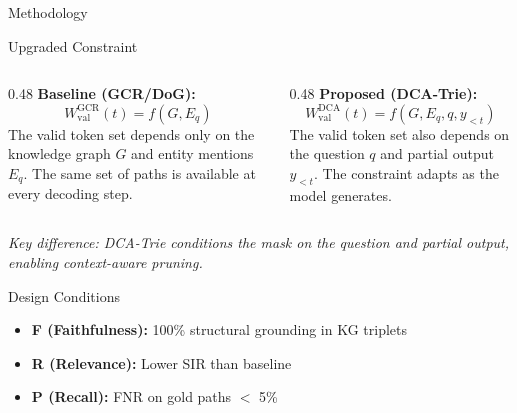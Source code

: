 \documentclass{beamer}
\begin{document}
\begin{frame}{Methodology}
\begin{figure}[h]
{
  }%
\end{figure}
\end{frame}

\begin{frame}{Upgraded Constraint}
  \begin{columns}[T]
    \begin{column}{0.48\textwidth}
      \textbf{Baseline (GCR/DoG):}
      \[
        W_{\text{val}}^{\text{GCR}}(t) = f(G, E_q)
      \]
      \vspace{0.3em}
      \footnotesize The valid token set depends only on the knowledge graph $G$ and entity mentions $E_q$. The same set of paths is available at every decoding step.
    \end{column}
    \begin{column}{0.48\textwidth}
      \textbf{Proposed (DCA-Trie):}
      \[
        W_{\text{val}}^{\text{DCA}}(t) = f(G, E_q, q, y_{<t})
      \]
      \vspace{0.3em}
      \footnotesize The valid token set also depends on the question $q$ and partial output $y_{<t}$. The constraint adapts as the model generates.
    \end{column}
  \end{columns}

  \vspace{0.5em}
  \centering
  \small\textit{Key difference: DCA-Trie conditions the mask on the question and partial output, enabling context-aware pruning.}
\end{frame}

\begin{frame}{Design Conditions}
    \begin{itemize}
      \item \textbf{F (Faithfulness):} 100\% structural grounding in KG triplets
      \item \textbf{R (Relevance):} Lower SIR than baseline
      \item \textbf{P (Recall):} FNR on gold paths $<$ 5\%
    \end{itemize}
\end{frame}
\end{document}
